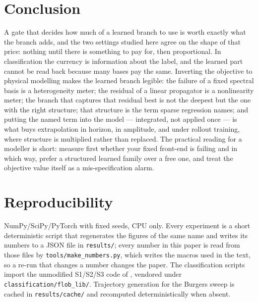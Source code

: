 \documentclass[11pt,a4paper]{article}
\begin{document}
\section{Conclusion}
A gate that decides how much of a learned branch to use is worth exactly what the branch adds, and the two settings studied here agree on the shape of that price: nothing until there is something to pay for, then proportional. In classification the currency is information about the label, and the learned part cannot be read back because many bases pay the same. Inverting the objective to physical modelling makes the learned branch legible: the failure of a fixed spectral basis is a heterogeneity meter; the residual of a linear propagator is a nonlinearity meter; the branch that captures that residual best is not the deepest but the one with the right structure; that structure is the term sparse regression names; and putting the named term into the model — integrated, not applied once — is what buys extrapolation in horizon, in amplitude, and under rollout training, where structure is multiplied rather than replaced. The practical reading for a modeller is short: measure first whether your fixed front-end is failing and in which way, prefer a structured learned family over a free one, and treat the objective value itself as a mis-specification alarm.

\section{Reproducibility}\label{sec:repro}
NumPy/SciPy/PyTorch with fixed seeds, CPU only. Every experiment is a short deterministic script that regenerates the figures of the same name and writes its numbers to a JSON file in \texttt{results/}; every number in this paper is read from those files by \texttt{tools/make\_numbers.py}, which writes the macros used in the text, so a re-run that changes a number changes the paper. The classification scripts import the unmodified S1/S2/S3 code of \cite{flob}, vendored under \texttt{classification/flob\_lib/}. Trajectory generation for the Burgers sweep is cached in \texttt{results/cache/} and recomputed deterministically when absent.
\end{document}
